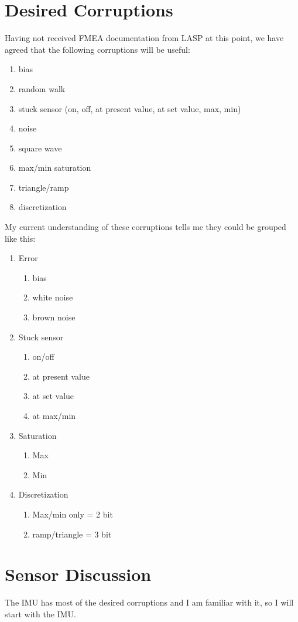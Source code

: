 \documentclass[]{BasiliskReportMemo}
\begin{document}
\section{Desired Corruptions}
Having not received FMEA documentation from LASP at this point, we have agreed that the following corruptions will be useful:
\begin{enumerate}
	\item bias
	\item random walk
	\item stuck sensor (on, off, at present value, at set value, max, min)
	\item noise
	\item square wave
	\item max/min saturation
	\item triangle/ramp
	\item discretization
\end{enumerate}
My current understanding of these corruptions tells me they could be grouped like this:
\begin{enumerate}
	\item Error
	\begin{enumerate}
		\item bias
		\item white noise
		\item brown noise
	\end{enumerate}
	\item Stuck sensor
	\begin{enumerate}
		\item on/off
		\item at present value
		\item at set value
		\item at max/min
	\end{enumerate}
		\item Saturation
		\begin{enumerate}
			\item Max
			\item Min
		\end{enumerate} 
	\item Discretization
		\begin{enumerate}
			\item Max/min only = 2 bit
			\item ramp/triangle = 3 bit
		\end{enumerate}
\end{enumerate}

\section{Sensor Discussion}
The IMU has most of the desired corruptions and I am familiar with it, so I will start with the IMU.
\end{document}
